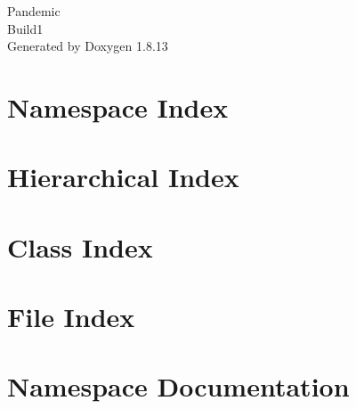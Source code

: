 \documentclass[twoside]{book}
\newcommand{\+}{\discretionary{\mbox{\scriptsize$\hookleftarrow$}}{}{}}
\newcommand{\clearemptydoublepage}{%
  \newpage{\pagestyle{empty}\cleardoublepage}%
}
\begin{document}
\hypersetup{pageanchor=false,
             bookmarksnumbered=true,
             pdfencoding=unicode
            }
\begin{titlepage}
\vspace*{7cm}
\begin{center}%
{\Large Pandemic \\[1ex]\large Build1 }\\
\vspace*{1cm}
{\large Generated by Doxygen 1.8.13}\\
\end{center}
\end{titlepage}
\clearemptydoublepage
{}
\tableofcontents
\clearemptydoublepage
{}
\hypersetup{pageanchor=true}

\chapter{Namespace Index}

\chapter{Hierarchical Index}

\chapter{Class Index}

\chapter{File Index}

\chapter{Namespace Documentation}




\end{document}
